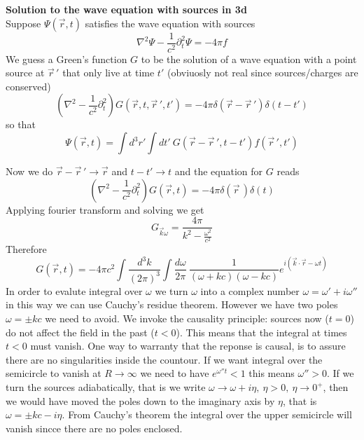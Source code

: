 \documentclass[12pt,a4paper]{article}
\begin{document}
\textbf{Solution to the wave equation with sources in 3d}\\
Suppose $\Psi(\vec{r},t)$ satisfies the wave equation with sources
\begin{equation}
	\nabla^2 \Psi - \frac{1}{c^2}\partial_t^2 \Psi = -4\pi f
\end{equation}
We guess a Green's function $G$ to be the solution of a wave equation with a point source at $\vec{r}\,'$ that only live at time $t'$ (obviuosly not real since sources/charges are conserved)
\begin{equation}
	\left( \nabla^2 - \frac{1}{c^2}\partial_t^2\right)G(\vec{r},t,\vec{r}\,',t') = - 4\pi \delta(\vec{r}-\vec{r}\,')\delta(t-t')
\end{equation}
so that
\begin{equation}
	\Psi(\vec{r},t) = \int d^3r' \int dt' \ G(\vec{r}-\vec{r}\,',t-t') f(\vec{r}\,',t')
\end{equation}


Now we do $\vec{r}-\vec{r}\,' \to \vec{r} $  and $t-t' \to t$ and the equation for $G$ reads
\begin{equation}
	\left( \nabla^2 - \frac{1}{c^2}\partial_t^2\right)G(\vec{r},t) = - 4\pi \delta(\vec{r}\,)\delta(t)
\end{equation}
Applying fourier transform and solving we get
\begin{equation}
	G_{\vec{k}\omega} = \frac{4\pi}{k^2 - \frac{\omega^2}{c^2}}
\end{equation}
Therefore
\begin{equation}
	G(\vec{r},t) = -4\pi c^2 \int \frac{d^3k}{(2\pi)^3}\int \frac{d\omega}{2\pi} \ \frac{1}{(\omega + kc)(\omega -kc)}e^{i(\vec{k}\cdot\vec{r}-\omega t)}
\end{equation}
In order to evalute integral over $\omega$ we turn $\omega$ into a complex number $\omega = \omega' + i\omega''$ in this way we can use Cauchy's residue theorem.  However we have two poles $\omega = \pm kc$ we need to avoid. We invoke the causality principle: sources now ($t = 0$) do not affect the field in the past ($t<0$). This means that the integral at times $t<0$ must vanish. One way to warranty that the reponse is causal, is to assure there are no singularities inside the countour.
If we want integral over the semicircle to vanish at $R\to\infty$ we need to have $e^{\omega''t}<1$ this means $\omega'' > 0$.
 If we turn the sources adiabatically, that is we write $\omega \to \omega+ i\eta, \ \eta >0, \ \eta \to 0^+$, then we would have moved the poles down to the imaginary axis by $\eta$, that is $\omega = \pm kc - i\eta$. From Cauchy's theorem the integral over the upper semicircle will vanish sincce there are no poles enclosed.
\end{document}
